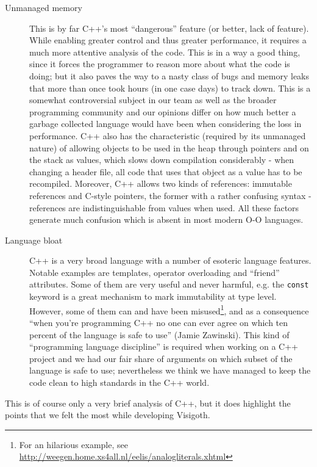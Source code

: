 \documentclass[a4paper,11pt,titlepage]{article}
\newcommand{\code}[1]{\texttt{#1}}
\begin{document}
\begin{description}

\item [Unmanaged memory] This is by far C++'s most ``dangerous''
  feature (or better, lack of feature). While enabling greater control
  and thus greater performance, it requires a much more attentive
  analysis of the code. This is in a way a good thing, since it forces
  the programmer to reason more about what the code is doing; but it
  also paves the way to a nasty class of bugs and memory leaks that
  more than once took hours (in one case days) to track down. This is
  a somewhat controversial subject in our team as well as the broader
  programming community and our opinions differ on how much better a
  garbage collected language would have been when considering the loss in
  performance. C++ also has the characteristic (required by its
  unmanaged nature) of allowing objects to be used in the heap through
  pointers and on the stack as values, which slows down compilation
  considerably - when changing a header file, all code that uses
  that object as a value has to be recompiled. Moreover, C++ allows two
  kinds of references: immutable references and C-style pointers, the
  former with
  a rather confusing syntax - references are indistinguishable from
  values when used. All these factors generate much confusion which is
  absent in most modern O-O languages.

\item [Language bloat] C++ is a very broad language with a number of
  esoteric language features. Notable examples are templates, operator
  overloading and ``friend'' attributes. Some of them are very
  useful and never harmful, e.g. the \code{const} keyword is a
  great mechanism to mark immutability at type level. However, some
  of them can and have been misused\footnote{For an hilarious example,
    see
    \url{http://weegen.home.xs4all.nl/eelis/analogliterals.xhtml}},
  and as a consequence ``when you're programming C++ no one can ever
  agree on which ten percent of the language is safe to use'' (Jamie
  Zawinski). This kind of ``programming language discipline'' is
  required when working on a C++ project and we had our fair share
  of arguments on which subset of the language is safe to use;
  nevertheless we think we have managed to keep the code clean to
  high standards in the C++ world.

\end{description}

This is of course only a very brief analysis of C++, but it does
highlight the points that we felt the most while developing Visigoth.
\end{document}
